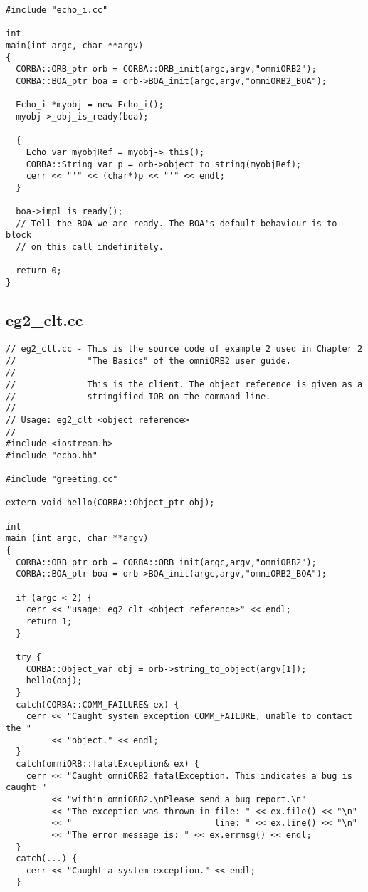 \documentclass[11pt,twoside,onecolumn]{book}
\begin{document}
{\begin{verbatim}
#include "echo_i.cc"

int
main(int argc, char **argv)
{
  CORBA::ORB_ptr orb = CORBA::ORB_init(argc,argv,"omniORB2");
  CORBA::BOA_ptr boa = orb->BOA_init(argc,argv,"omniORB2_BOA");

  Echo_i *myobj = new Echo_i();
  myobj->_obj_is_ready(boa);

  {
    Echo_var myobjRef = myobj->_this();
    CORBA::String_var p = orb->object_to_string(myobjRef);
    cerr << "'" << (char*)p << "'" << endl;
  }

  boa->impl_is_ready();
  // Tell the BOA we are ready. The BOA's default behaviour is to block
  // on this call indefinitely.

  return 0;
}
\end{verbatim}
\newpage

\subsection{eg2\_clt.cc}
\begin{verbatim}
// eg2_clt.cc - This is the source code of example 2 used in Chapter 2
//              "The Basics" of the omniORB2 user guide.
//
//              This is the client. The object reference is given as a
//              stringified IOR on the command line.
//
// Usage: eg2_clt <object reference>
//
#include <iostream.h>
#include "echo.hh"

#include "greeting.cc"

extern void hello(CORBA::Object_ptr obj);

int
main (int argc, char **argv) 
{
  CORBA::ORB_ptr orb = CORBA::ORB_init(argc,argv,"omniORB2");
  CORBA::BOA_ptr boa = orb->BOA_init(argc,argv,"omniORB2_BOA");

  if (argc < 2) {
    cerr << "usage: eg2_clt <object reference>" << endl;
    return 1;
  }

  try {
    CORBA::Object_var obj = orb->string_to_object(argv[1]);
    hello(obj);
  }
  catch(CORBA::COMM_FAILURE& ex) {
    cerr << "Caught system exception COMM_FAILURE, unable to contact the "
         << "object." << endl;
  }
  catch(omniORB::fatalException& ex) {
    cerr << "Caught omniORB2 fatalException. This indicates a bug is caught "
         << "within omniORB2.\nPlease send a bug report.\n"
         << "The exception was thrown in file: " << ex.file() << "\n"
         << "                            line: " << ex.line() << "\n"
         << "The error message is: " << ex.errmsg() << endl;
  }
  catch(...) {
    cerr << "Caught a system exception." << endl;
  }


\end{verbatim}}
\end{document}
